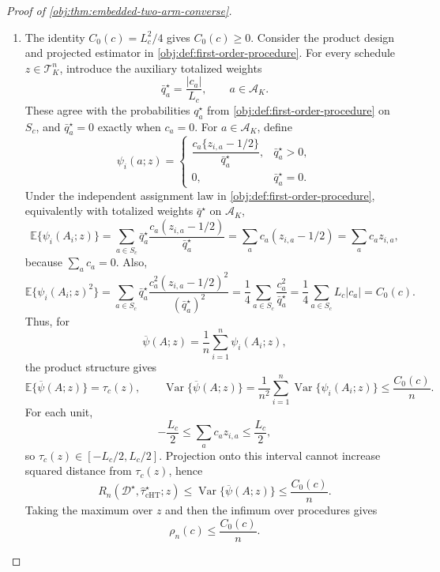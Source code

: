 \documentclass[11pt]{article}
\begin{document}
\begin{proof}[Proof of \cref{obj:thm:embedded-two-arm-converse}]
\begin{enumerate}
\item The identity \(C_0(c)=L_c^2/4\) gives \(C_0(c)\ge0\). Consider the product design and projected estimator in \cref{obj:def:first-order-procedure}. For every schedule \(z\in\mathcal T_K^n\), introduce the auxiliary totalized weights
\[
\bar q_a^\star=\frac{|c_a|}{L_c},
\qquad a\in\mathcal A_K.
\]
These agree with the probabilities \(q_a^\star\) from \cref{obj:def:first-order-procedure} on \(S_c\), and \(\bar q_a^\star=0\) exactly when \(c_a=0\). For \(a\in\mathcal A_K\), define
\[
\psi_i(a;z)
=
\begin{cases}
\dfrac{c_a\{z_{i,a}-1/2\}}{\bar q_a^\star},&\bar q_a^\star>0,\\[1.2ex]
0,&\bar q_a^\star=0.
\end{cases}
\]
Under the independent assignment law in \cref{obj:def:first-order-procedure}, equivalently with totalized weights \(\bar q^\star\) on \(\mathcal A_K\),
\[
\mathbb E\{\psi_i(A_i;z)\}
=
\sum_{a\in S_c} \bar q_a^\star
\frac{c_a(z_{i,a}-1/2)}{\bar q_a^\star}
=
\sum_a c_a(z_{i,a}-1/2)
=
\sum_a c_az_{i,a},
\]
because \(\sum_a c_a=0\). Also,
\[
\mathbb E\{\psi_i(A_i;z)^2\}
=
\sum_{a\in S_c}
\bar q_a^\star
\frac{c_a^2(z_{i,a}-1/2)^2}{(\bar q_a^\star)^2}
=
\frac14\sum_{a\in S_c}\frac{c_a^2}{\bar q_a^\star}
=
\frac14\sum_{a\in S_c}L_c|c_a|
=
C_0(c).
\]
Thus, for
\[
\overline\psi(A;z)=\frac1n\sum_{i=1}^n\psi_i(A_i;z),
\]
the product structure gives
\[
\mathbb E\{\overline\psi(A;z)\}=\tau_c(z),
\qquad
\operatorname{Var}\{\overline\psi(A;z)\}
=
\frac1{n^2}\sum_{i=1}^n\operatorname{Var}\{\psi_i(A_i;z)\}
\le
\frac{C_0(c)}{n}.
\]
For each unit,
\[
-\frac{L_c}{2}\le \sum_a c_a z_{i,a}\le \frac{L_c}{2},
\]
so \(\tau_c(z)\in[-L_c/2,L_c/2]\). Projection onto this interval cannot increase squared distance from \(\tau_c(z)\), hence
\[
R_n(\mathcal D^\star,\widehat\tau_{\mathrm{cHT}}^\star;z)
\le
\operatorname{Var}\{\overline\psi(A;z)\}
\le
\frac{C_0(c)}{n}.
\]
Taking the maximum over \(z\) and then the infimum over procedures gives
\[
\rho_n(c)\le \frac{C_0(c)}{n}.
\]


\end{enumerate}
\end{proof}
\end{document}
